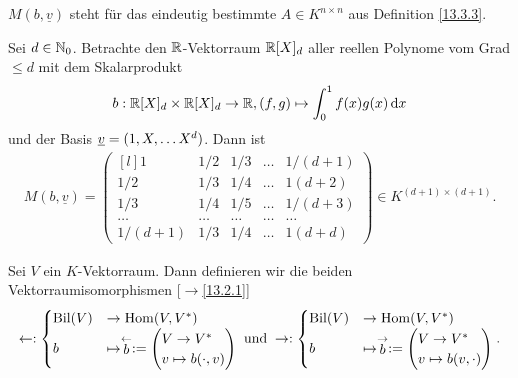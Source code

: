 \documentclass[../../main.tex]{subfiles}
\begin{document}
\begin{nt}\label{13.3.5}  
$M(b,\underline{v})$ steht für das eindeutig bestimmte $A\in K^{n\times n}$ aus Definition \ref{13.3.3}.
\end{nt}

\begin{bsp}\label{13.3.6}
Sei $d\in \mathbb N_0$. Betrachte den $\mathbb R$-Vektorraum $\mathbb R[X]_d$ aller reellen Polynome vom Grad $\le d$ mit dem Skalarprodukt
\begin{align*}
b: \mathbb R[X]_d\times \mathbb R[X]_d\to \mathbb R, (f,g)\mapsto \int_0^1 f(x)g(x)\,\text{d}x
\end{align*}
und der Basis ${\underline v}=(1,X,\ldots X^d)$. Dann ist
\begin{align*}
M(b,\underline{v})=\begin{pmatrix*}[l]
1& 1/2& 1/3&\ldots &1/(d+1)\\
1/2 &1/3& 1/4&\ldots &1(d+2)\\
1/3& 1/4& 1/5&\ldots &1/(d+3)\\
\ldots  &\ldots & \ldots &\ldots &\ldots \\
1/(d+1) &1/3& 1/4&\ldots &1(d+d)
\end{pmatrix*}\in K^{(d+1)\times(d+1)}.
\end{align*}
\end{bsp}
	
\begin{df}\label{13.3.7}
Sei $V$ ein $K$-Vektorraum. Dann definieren wir die beiden Vektorraumisomorphismen [$\to$\ref{13.2.1}] 
\begin{align*}
	\leftarrow: \begin{cases}\Bil(V)&\to\Hom(V,V^*)\\b&\mapsto \lvec b:=\begin{pmatrix*}[l]V\to V^*\\ v\mapsto b(\cdot, v)\end{pmatrix*}\end{cases} \;\text{und}\;
	\rightarrow: \begin{cases}\Bil(V)&\to\Hom(V,V^*)\\b&\mapsto \rvec b:=\begin{pmatrix*}[l]V\to V^*\\ v\mapsto b(v, \cdot)\end{pmatrix*}\end{cases}.
\end{align*}
\end{df}
\end{document}
